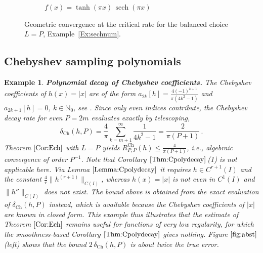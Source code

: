 \documentclass[11pt,a4paper]{scrartcl}
\newtheorem{example}[theorem]{Example}
\numberwithin{equation}{section}
\numberwithin{table}{section}
\numberwithin{figure}{section}
\newcommand{\Np}{{\mathbb N}_0}
\newcommand{\dch}{\delta_{\mathrm{Ch}}}
\newcommand{\Rch}{R^{\mathrm{Ch}}}
\begin{document}
\begin{figure}[htbp]
\begin{subfigure}[t]{0.495\textwidth}
		\caption{$f(x)=\tanh(\pi x)\,\operatorname{sech}(\pi x)$}
		\label{fig:sechsin}
	\end{subfigure}
	\caption{Geometric convergence at the critical rate for the balanced choice
		$L=P$, Example~\ref{Ex:sechnum}.}
	\label{fig:sharpFT}
\end{figure}

\subsection{Chebyshev sampling polynomials}

\begin{example}
	\label{Ex:abst} \textbf{Polynomial decay of Chebyshev coefficients.}
	The Chebyshev  coefficients of  $h(x) = |x|$ are of the form
	$a_{2k}[h] = \frac{4(-1)^{k+1}}{\pi(4k^2-1)}$ and $a_{2k+1}[h] =
	0$, $k \in \Np$, see \textnormal{\cite[Table A.2]{PlPoStTa23}}.
	Since only even indices contribute, the Chebyshev decay rate
	for even $P = 2m$ evaluates exactly by telescoping,
	$$
	\textstyle \dch(h,P) = \frac{4}{\pi}\sum\limits_{k=m+1}^\infty \frac{1}{4k^2-1}
	= \frac{2}{\pi(P+1)}\,.
	$$
	Theorem $\ref{Cor:Ech}$ with $L=P$ yields $\Rch_{P,P}(h) \leq
	\frac{4}{\pi(P+1)}$, i.e., algebraic convergence of order $P^{-1}$.
	Note that Corollary $\ref{Thm:Cpolydecay}$\,(1) is \emph{not} applicable here. Via
	Lemma $\ref{Lemma:Cpolydecay}$ it requires $h \in C^{r+1}(I)$ and the constant
	$\frac{4}{r}\|h^{(r+1)}\|_{C(I)}$, whereas $h(x)=|x|$ is not even in $C^1(I)$ and
	$\|h''\|_{C(I)}$ does not exist. The bound above is obtained from the exact evaluation of
	$\dch(h,P)$ instead, which is available because the Chebyshev coefficients of $|x|$ are known in
	closed form. This example thus illustrates that the estimate of Theorem $\ref{Cor:Ech}$ remains
	useful for functions of very low regularity, for which the smoothness-based
	Corollary $\ref{Thm:Cpolydecay}$ gives nothing.
	Figure $\ref{fig:abst}$(left) shows that
	the bound $2\,\dch(h,P)$ is about twice the true error.
\end{example}
\end{document}
